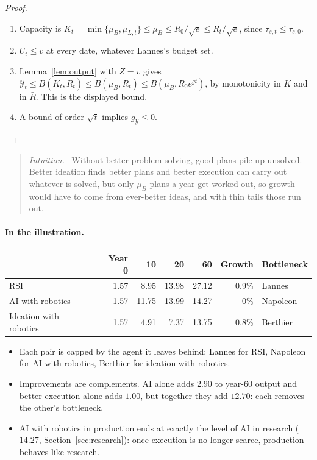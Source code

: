 \documentclass[11pt]{article}
\newcommand{\Nap}{\textcolor{nap}{Napoleon}}
\newcommand{\Ber}{\textcolor{ber}{Berthier}}
\newcommand{\Lan}{\textcolor{lan}{Lannes}}
\theoremstyle{remark}
\newenvironment{intuition}{\begin{quote}\small\color{muted}\textit{Intuition.}\ }{\end{quote}}
\newcommand{\Ycal}{\mathcal{Y}}
\begin{document}
\begin{proof}
\begin{enumerate}
  \item Capacity is $K_t=\min\{\mu_B,\mu_{L,t}\}\le\mu_B\le\bar R_0/\sqrt e\le\bar R_t/\sqrt e$, since $\tau_{s,t}\le\tau_{s,0}$.
  \item $U_t\le v$ at every date, whatever \Lan's budget set.
  \item Lemma~\ref{lem:output} with $Z=v$ gives $\Ycal_t\le B(K_t,\bar R_t)\le B(\mu_B,\bar R_t)\le B(\mu_B,\bar R_0e^{gt})$, by monotonicity in $K$ and in $\bar R$. This is the displayed bound.
  \item A bound of order $\sqrt t$ implies $g_{\Ycal}\le0$. \qedhere
\end{enumerate}
\end{proof}

\begin{intuition}
Without better problem solving, good plans pile up unsolved. Better ideation finds better plans and better execution can carry out whatever is solved, but only $\mu_B$ plans a year get worked out, so growth would have to come from ever-better ideas, and with thin tails those run out.
\end{intuition}

\paragraph{In the illustration.}
\begin{center}
\renewcommand{\arraystretch}{1.12}
\begin{tabular}{@{}l r r r r r l@{}}
\toprule
& Year 0 & 10 & 20 & 60 & Growth & Bottleneck\\
\midrule
\textcolor{nap}{RSI} & 1.57 & 8.95 & 13.98 & 27.12 & 0.9\% & \Lan\\
\textcolor{lan}{AI with robotics} & 1.57 & 11.75 & 13.99 & 14.27 & 0\% & \Nap\\
Ideation with robotics & 1.57 & 4.91 & 7.37 & 13.75 & 0.8\% & \Ber\\
\bottomrule
\end{tabular}
\end{center}
\begin{itemize}
  \item Each pair is capped by the agent it leaves behind: \Lan{} for RSI, \Nap{} for AI with robotics, \Ber{} for ideation with robotics.
  \item Improvements are complements. AI alone adds $2.90$ to year-60 output and better execution alone adds $1.00$, but together they add $12.70$: each removes the other's bottleneck.
  \item AI with robotics in production ends at exactly the level of AI in research ($14.27$, Section~\ref{sec:research}): once execution is no longer scarce, production behaves like research.
\end{itemize}
\end{document}
